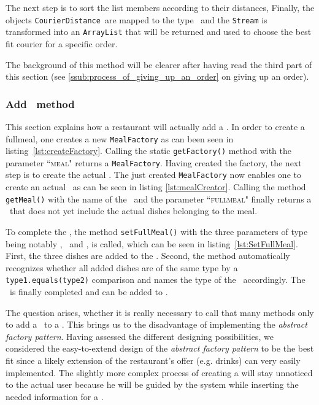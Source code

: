 The next step is to sort the list members according to their distances,
Finally, the objects \lstinline|CourierDistance|~are mapped to the type \Courier~and
the \lstinline|Stream| is transformed into an \lstinline|ArrayList| 
that will be returned and used to choose the best fit courier for a specific order. 

The background of this method will be clearer after having read 
the third part of this section (see \ref{ssub:process_of_giving_up_an_order}
on giving up an order).


\subsubsection{Add \FullMeal~method} %
\label{ssub:add_full_meal_method}

This section explains how a restaurant will actually add a \FullMeal.
In order to create a fullmeal, one creates a new \lstinline|MealFactory| as can been seen in
listing~\ref{lst:createFactory}. Calling the static \lstinline|getFactory()|
method with the parameter ``\textsc{meal}" returns a
\lstinline|MealFactory|. Having created the factory, the next step is to create 
the actual \FullMeal. The just created \lstinline|MealFactory| now enables one to
create an actual \Meal~as can be seen in listing \ref{lst:mealCreator}. Calling the
method \lstinline|getMeal()| with the name of the \Meal~and the parameter ``\textsc{fullmeal}"
finally returns a \FullMeal~that does not yet include the actual dishes belonging to
the meal. 

To complete the \FullMeal, the method \lstinline|setFullMeal()| with the three
parameters of type \Dish~ being notably \Starter, \MainDish~and \Dessert, is called,
which can be seen in listing~\ref{lst:SetFullMeal}. First, the three dishes are added to
the \FullMeal. Second, the method automatically recognizes whether all added dishes are
of the same type by a \lstinline|type1.equals(type2)| comparison and names the type of the
\Meal~accordingly. The \FullMeal~is finally completed and can be added to \Restaurant. 

The question arises, whether it is really necessary to call that many methods only to 
add a \FullMeal~to a \Restaurant. This brings us to the disadvantage of
implementing the \emph{abstract factory pattern}. Having assessed the different
designing possibilities, we considered the easy-to-extend design of the 
\emph{abstract factory pattern} to be the best fit since a likely extension 
of the restaurant's offer (e.g. drinks) can very easily implemented. 
The slightly more complex process of creating a \FullMeal will stay unnoticed
to the actual user because he will be guided by the system while inserting
the needed information for a \FullMeal.

